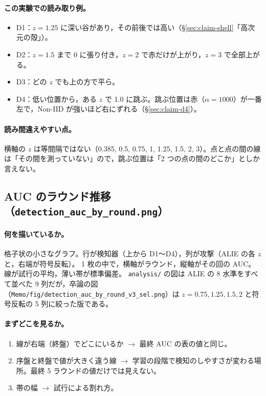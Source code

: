 \documentclass[a4j, dvipdfmx]{jsarticle}  %
\begin{document}
\paragraph{この実験での読み取り例。}
\begin{itemize}
  \item D1：$z = 1.25$ に深い谷があり，その前後では高い（\S\ref{sec:claim-shell}「高次元の殻」）。
  \item D2：$z = 1.5$ まで 0 に張り付き，$z = 2$ で赤だけが上がり，$z = 3$ で全部上がる。
  \item D3：どの $z$ でも上の方で平ら。
  \item D4：低い位置から，ある $z$ で 1.0 に跳ぶ。跳ぶ位置は赤（$\alpha = 1000$）が一番左で，Non-IID が強いほど右にずれる（\S\ref{sec:claim-d4}）。
\end{itemize}

\paragraph{読み間違えやすい点。}
横軸の $z$ は等間隔ではない（0.385, 0.5, 0.75, 1, 1.25, 1.5, 2, 3）。点と点の間の線は「その間を測っていない」ので，跳ぶ位置は「2 つの点の間のどこか」としか言えない。

\subsection{AUC のラウンド推移（\texttt{detection\_auc\_by\_round.png}）}

\paragraph{何を描いているか。}
格子状の小さなグラフ。行が検知器（上から D1〜D4），列が攻撃（ALIE の各 $z$ と，右端が符号反転）。
1 枚の中で，横軸がラウンド，縦軸がその回の AUC。線が試行の平均，薄い帯が標準偏差。
\texttt{analysis/} の図は ALIE の 8 水準をすべて並べた 9 列だが，卒論の図（\texttt{Memo/fig/detection\_auc\_by\_round\_v3\_sel.png}）は $z = 0.75, 1.25, 1.5, 2$ と符号反転の 5 列に絞った版である。

\paragraph{まずどこを見るか。}
\begin{enumerate}
  \item 線が右端（終盤）でどこにいるか $\rightarrow$ 最終 AUC の表の値と同じ。
  \item 序盤と終盤で値が大きく違う線 $\rightarrow$ 学習の段階で検知のしやすさが変わる場所。最終 5 ラウンドの値だけでは見えない。
  \item 帯の幅 $\rightarrow$ 試行による割れ方。
\end{enumerate}
\end{document}
